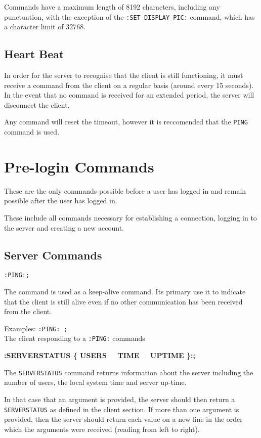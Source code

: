 Commands have a maximum length of 8192 characters, including any punctuation, with the exception of the \texttt{:SET DISPLAY\_PIC:} command, which has a character limit of 32768.

\subsection{Heart Beat}

In order for the server to recognise that the client is still functioning, it must receive a command from the client on a regular basis (around every 15 seconds). In the event that no command is received for an extended period, the server will disconnect the client.

Any command will reset the timeout, however it is reccomended that the \texttt{PING} command is used.

\section{Pre-login Commands}

These are the only commands possible before a user has logged in and remain possible after the user has logged in.

These include all commands necessary for establishing a connection, logging in to the server and creating a new account.

\subsection{Server Commands}

\texttt{:PING:;}

The command is used as a keep-alive command. Its primary use it to indicate that the client is still alive even if no other communication has been received from the client. 

Examples:
\texttt{:PING: ;} \\
The client responding to a \texttt{:PING:} commands

{\bf :SERVERSTATUS \{ USERS \ \vline \ TIME \ \vline \ UPTIME \}:;}

The \texttt{SERVERSTATUS} command returns information about the server including the number of users, the local system time and server up-time.
 
In that case that an argument is provided, the server should then return a \texttt{SERVERSTATUS} as defined in the client section. If more than one argument is provided, then the server should return each value on a new line in the order which the arguments were received (reading from left to right).

